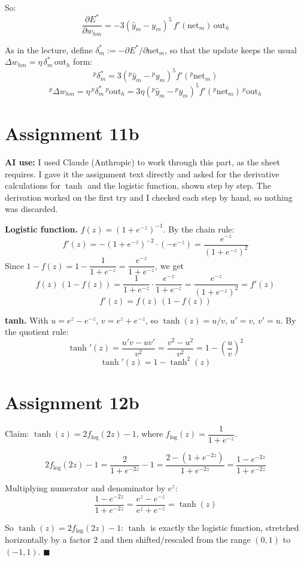 \documentclass[11pt,a4paper]{article}
\begin{document}
So:
\[
  \frac{\partial E^*}{\partial w_{hm}} = -3(\hat y_m-y_m)^5\,f'(\mathrm{net}_m)\,\mathrm{out}_h
\]

As in the lecture, define $\delta_m^* := -\partial E^*/\partial \mathrm{net}_m$, so that the update keeps the usual
$\Delta w_{hm}=\eta\,\delta_m^*\,\mathrm{out}_h$ form:
\[
  \boxed{{}^p\delta_m^* = 3\left({}^p\hat y_m - {}^py_m\right)^5 f'({}^p\mathrm{net}_m)}
\]
\[
  {}^p\Delta w_{hm} = \eta\,{}^p\delta_m^*\,{}^p\mathrm{out}_h = 3\eta\left({}^p\hat y_m-{}^py_m\right)^5 f'({}^p\mathrm{net}_m)\,{}^p\mathrm{out}_h
\]

\section*{Assignment 11b}

\textbf{AI use:} I used Claude (Anthropic) to work through this part, as the sheet requires. I gave it the
assignment text directly and asked for the derivative calculations for $\tanh$ and the logistic function, shown
step by step. The derivation worked on the first try and I checked each step by hand, so nothing was discarded.

\textbf{Logistic function.} $f(z)=(1+e^{-z})^{-1}$. By the chain rule:
\[
  f'(z) = -(1+e^{-z})^{-2}\cdot(-e^{-z}) = \frac{e^{-z}}{(1+e^{-z})^2}
\]
Since $1-f(z) = 1-\dfrac{1}{1+e^{-z}} = \dfrac{e^{-z}}{1+e^{-z}}$, we get
\[
  f(z)\,(1-f(z)) = \frac{1}{1+e^{-z}}\cdot\frac{e^{-z}}{1+e^{-z}} = \frac{e^{-z}}{(1+e^{-z})^2} = f'(z)
\]
\[
  \boxed{f'(z) = f(z)\,(1-f(z))}
\]

\textbf{tanh.} With $u=e^z-e^{-z}$, $v=e^z+e^{-z}$, so $\tanh(z)=u/v$, $u'=v$, $v'=u$. By the quotient rule:
\[
  \tanh'(z) = \frac{u'v-uv'}{v^2} = \frac{v^2-u^2}{v^2} = 1-\left(\frac{u}{v}\right)^2
\]
\[
  \boxed{\tanh'(z) = 1-\tanh^2(z)}
\]

\section*{Assignment 12b}

Claim: $\tanh(z) = 2f_{\log}(2z)-1$, where $f_{\log}(z)=\dfrac{1}{1+e^{-z}}$.

\[
  2f_{\log}(2z)-1 = \frac{2}{1+e^{-2z}}-1 = \frac{2-(1+e^{-2z})}{1+e^{-2z}} = \frac{1-e^{-2z}}{1+e^{-2z}}
\]

Multiplying numerator and denominator by $e^{z}$:
\[
  \frac{1-e^{-2z}}{1+e^{-2z}} = \frac{e^{z}-e^{-z}}{e^{z}+e^{-z}} = \tanh(z)
\]

So $\tanh(z) = 2f_{\log}(2z)-1$: $\tanh$ is exactly the logistic function, stretched horizontally by a factor $2$
and then shifted/rescaled from the range $(0,1)$ to $(-1,1)$. $\blacksquare$
\end{document}
